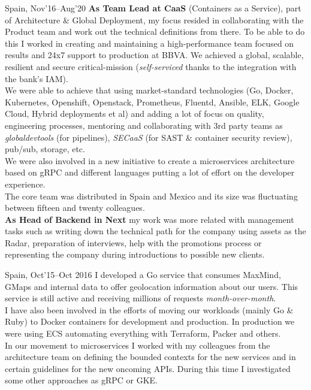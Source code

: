 \documentclass[10pt, a4paper, sans]{moderncv}
\begin{document}
{Spain, Nov'16--Aug'20}
{\textbf{As Team Lead at CaaS} (Containers as a Service), part of Architecture \& Global Deployment, my focus resided in collaborating with the Product team and work out the technical definitions from there. To be able to do this I worked in creating and maintaining a high-performance team focused on results and 24x7 support to production at BBVA. We achieved a global, scalable, resilient and secure critical-mission (\textit{self-serviced} thanks to the integration with the bank's IAM).\\
We were able to achieve that using market-standard technologies (Go, Docker, Kubernetes, Openshift, Openstack, Prometheus, Fluentd, Ansible, ELK, Google Cloud, Hybrid deployments et al) and adding a lot of focus on quality, engineering processes, mentoring and collaborating with 3rd party teams as \textit{globaldevtools} (for pipelines), \textit{SECaaS} (for SAST \& container security review), pub/sub, storage, etc.\\
We were also involved in a new initiative to create a microservices architecture based on gRPC and different languages putting a lot of effort on the developer experience.\\
The core team was distributed in Spain and Mexico and its size was fluctuating between fifteen and twenty colleagues.\\
\textbf{As Head of Backend in Next} my work was more related with management tasks such as writing down the technical path for the company using assets as the Radar, preparation of interviews, help with the promotions process or representing the company during introductions to possible new clients.\\}

{Spain, Oct'15--Oct 2016}
{I developed a Go service that consumes MaxMind, GMaps and internal data to offer geolocation information about our users.
This service is still active and receiving millions of requests \textit{month-over-month}.\\
I have also been involved in the efforts of moving our workloads (mainly Go \& Ruby) to Docker containers for development and production.
In production we were using ECS automating everything with Terraform, Packer and others.\\
In our movement to microservices I worked with my colleagues from the architecture team on defining the bounded contexts for the new services and in certain guidelines for the new oncoming APIs.
During this time I investigated some other approaches as gRPC or GKE.\\}
\end{document}
